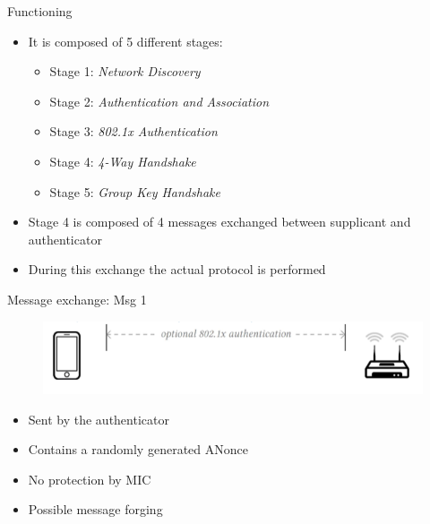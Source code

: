 \documentclass[11pt,t]{beamer}
\begin{document}
 \begin{frame}[fragile]{Functioning}  
	
	\begin{itemize}
		\item It is composed of 5 different stages:
		\begin{itemize}
			\item Stage 1: \textit{Network Discovery}
			\item Stage 2: \textit{Authentication and Association}
			\item Stage 3: \textit{802.1x Authentication} 
			\item Stage 4: \textit{4-Way Handshake}  
			\item Stage 5: \textit{Group Key Handshake} 
		\end{itemize}
		\item Stage 4 is composed of 4 messages exchanged between supplicant and authenticator
		\item During this exchange the actual protocol is performed
	\end{itemize}


 \sed
 \end{frame}

 \begin{frame}[fragile]{Message exchange: Msg 1}  
	\begin{figure}[tbh]
		\centering
		\includegraphics[width=0.8\linewidth]{graphics/4wh/phase1.png}
		\label{fig:phase1}
	  \end{figure}
	
	\begin{itemize}
		\item Sent by the authenticator 
		\item Contains a randomly generated ANonce 
		\item No protection by MIC
		\item Possible message forging
	\end{itemize}


 \end{frame}
\end{document}
